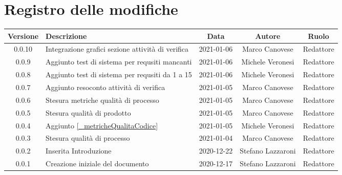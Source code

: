 \section*{Registro delle modifiche}

\begin{center}
	\begin{longtable}{|c|p{5cm}|c|c|c|}
	\hline
	\rowcolor{lighter-grayer}
	\textbf{Versione} & \textbf{Descrizione} & \textbf{Data} & \textbf{Autore} & \textbf{Ruolo} \\
	\hline
	\endfirsthead


	\hline
	0.0.10& Integrazione grafici sezione attività di verifica & 2021-01-06 & Marco Canovese & Redattore \\
	0.0.9 & Aggiunto test di sistema per requsiti mancanti& 2021-01-06 & Michele Veronesi & Redattore \\
	0.0.8 & Aggiunto test di sistema per requsiti da 1 a 15 & 2021-01-06 & Michele Veronesi & Redattore \\
	0.0.7 & Aggiunto resoconto attività di verifica & 2021-01-05 & Marco Canovese & Redattore \\
	0.0.6 & Stesura metriche qualità di processo & 2021-01-05 & Marco Canovese & Redattore \\
	0.0.5 & Stesura qualità di prodotto & 2021-01-05 & Marco Canovese & Redattore \\
	0.0.4 & Aggiunto \ref{_metricheQualitaCodice} & 2021-01-05 & Michele Veronesi & Redattore \\
	0.0.3 & Stesura qualità di processo & 2021-01-04 & Marco Canovese & Redattore \\
	0.0.2 & Inserita Introduzione & 2020-12-22 & Stefano Lazzaroni & Redattore\\
    0.0.1 & Creazione iniziale del documento & 2020-12-17 & Stefano Lazzaroni & Redattore\\
	\hline

	\end{longtable}
\end{center}